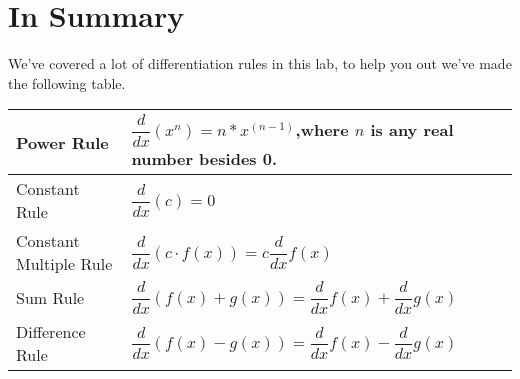 \documentclass{ximera}
\begin{document}
\section{In Summary}
We've covered a lot of differentiation rules in this lab, to help you out we've made the following table.
\begin{center}
\renewcommand{\arraystretch}{3}
\begin{tabular}{| l | p{7.5cm} |}
    \hline
    Power Rule & $\displaystyle \dfrac{d}{dx}(x^n)=n*x^{(n-1)}$,where $n$ is any real number besides 0. \\
    \hline
    Constant Rule & $\displaystyle\dfrac{d}{dx}(c) = 0$ \\
    \hline
    Constant Multiple Rule & $\displaystyle\dfrac{d}{dx}(c \cdot f(x))=c\dfrac{d}{dx}f(x)$ \\
    \hline
    Sum Rule & $\displaystyle\dfrac{d}{dx}(f(x)+g(x))=\dfrac{d}{dx}f(x)+\dfrac{d}{dx}g(x)$ \\
    \hline
    Difference Rule & $\displaystyle\dfrac{d}{dx}(f(x)-g(x))=\dfrac{d}{dx}f(x)-\dfrac{d}{dx}g(x)$ \\
    \hline
\end{tabular}
\end{center}

\pagebreak
\end{document}
